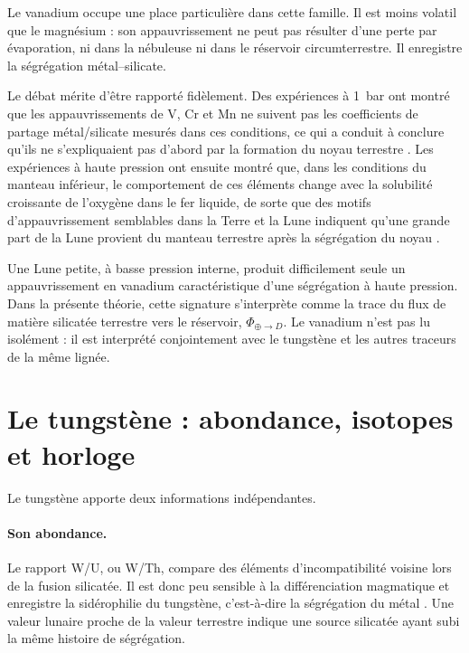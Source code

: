 \documentclass[11pt,a4paper,openany]{report}
\begin{document}
Le vanadium occupe une place particulière dans cette famille. Il est moins volatil que le magnésium :
son appauvrissement ne peut pas résulter d'une perte par évaporation, ni dans la nébuleuse ni
dans le réservoir circumterrestre. Il enregistre la ségrégation métal--silicate.

Le débat mérite d'être rapporté fidèlement. Des expériences à 1~bar ont montré que les
appauvrissements de V, Cr et Mn ne suivent pas les coefficients de partage métal/silicate mesurés
dans ces conditions, ce qui a conduit à conclure qu'ils ne s'expliquaient pas d'abord par la
formation du noyau terrestre \cite{Drake1989}. Les expériences à haute pression ont ensuite
montré que, dans les conditions du manteau inférieur, le comportement de ces éléments change
avec la solubilité croissante de l'oxygène dans le fer liquide, de sorte que des motifs
d'appauvrissement semblables dans la Terre et la Lune indiquent qu'une grande part de la Lune
provient du manteau terrestre après la ségrégation du noyau \cite{Ringwood1990,GessmannRubie2000}.

\begin{lecture}
Une Lune petite, à basse pression interne, produit difficilement seule un appauvrissement en
vanadium caractéristique d'une ségrégation à haute pression. Dans la présente théorie, cette
signature s'interprète comme la trace du flux de matière silicatée terrestre vers le réservoir,
$\Phi_{\oplus\to D}$. Le vanadium n'est pas lu isolément : il est interprété conjointement avec le
tungstène et les autres traceurs de la même lignée.
\end{lecture}

\section{Le tungstène : abondance, isotopes et horloge}

Le tungstène apporte deux informations indépendantes.

\paragraph{Son abondance.}
Le rapport W/U, ou W/Th, compare des éléments d'incompatibilité voisine lors de la fusion
silicatée. Il est donc peu sensible à la différenciation magmatique et enregistre la sidérophilie du
tungstène, c'est-à-dire la ségrégation du métal \cite{Newsom1986}. Une valeur lunaire proche de la
valeur terrestre indique une source silicatée ayant subi la même histoire de ségrégation.
\end{document}
